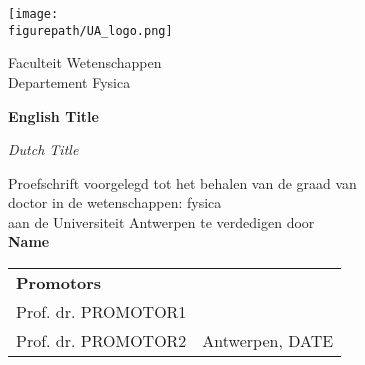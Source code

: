 \begin{titlepage}
   \begin{center}
       \vspace*{1cm}
       
       \texttt{[image: \\figurepath/UA\_logo.png]}
       
       \vspace{1cm}
         
       Faculteit Wetenschappen\\
       Departement Fysica\\
       
       \vspace{3cm}
       
       {\huge
       \textbf{English Title}
       }
 
       \vspace{0.5cm}
       \textit{Dutch Title}
 
       \vfill
       
       Proefschrift voorgelegd tot het behalen van de graad van \\
       doctor in de wetenschappen: fysica \\
       aan de Universiteit Antwerpen te verdedigen door \\
       
        \vspace{1cm}
        \textbf{Name}
       
       \vfill
       
       \begin{tabular}{l @{\hskip 18 em} r}
       \textbf{Promotors} \\ Prof. dr. PROMOTOR1 \\ Prof. dr. PROMOTOR2
       & Antwerpen, DATE
       \end{tabular}
 
       \vspace{0.8cm}
 
   \end{center}
\end{titlepage}
